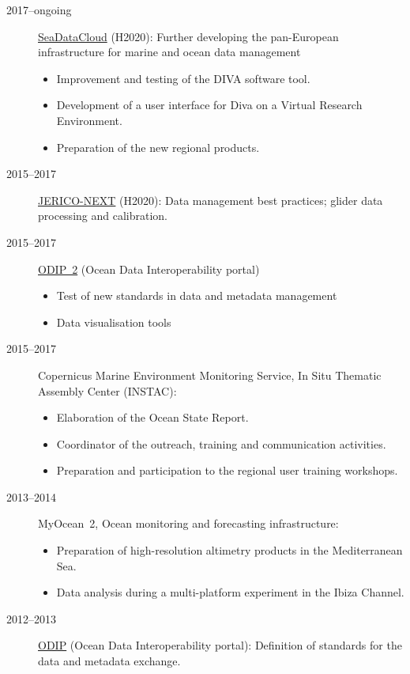 \documentclass[11pt,a4paper,svgnames]{article}
\begin{document}
\begin{description}
\item[2017--ongoing] \href{https://www.seadatanet.org}{SeaDataCloud} (H2020): Further developing the pan-European infrastructure for marine and ocean data management
\begin{itemize}
\item Improvement and testing of the DIVA software tool.
\item Development of a user interface for Diva on a Virtual Research Environment.
\item Preparation of the new regional products.
\end{itemize}


\item[2015--2017] \href{http://www.jerico-ri.eu/}{JERICO-NEXT} (H2020): Data management best practices; glider data processing and calibration.
\item[2015--2017] \href{http://www.odip.eu/}{ODIP~2} (Ocean Data Interoperability portal)
\begin{itemize}
\item Test of new standards in data and metadata management 
\item Data visualisation tools
\end{itemize}

\item[2015--2017] Copernicus Marine Environment Monitoring Service, In Situ Thematic Assembly Center (INSTAC):
\begin{itemize}
\item Elaboration of the Ocean State Report.
\item Coordinator of the outreach, training and communication activities.
\item Preparation and participation to the regional user training workshops.
\end{itemize}

\item[2013--2014] MyOcean~2, Ocean monitoring and forecasting infrastructure:
\begin{itemize}
\item Preparation of high-resolution altimetry products in the Mediterranean Sea.
\item Data analysis during a multi-platform experiment in the Ibiza Channel.
\end{itemize}

\item[2012--2013] \href{http://www.odip.eu/}{ODIP} (Ocean Data Interoperability portal): Definition of standards for the data and metadata exchange.


\end{description}
\end{document}
